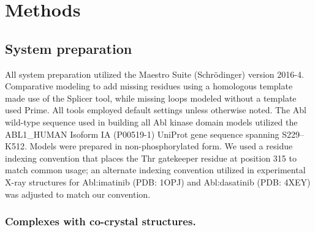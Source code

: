 \documentclass[phd,tocprelim]{cornell}
\begin{document}
\section{Methods}
\label{sec:methods}

\subsection{System preparation}
All system preparation utilized the Maestro Suite (Schr\"{o}dinger) version 2016-4. 
Comparative modeling to add missing residues using a homologous template made use of the Splicer tool, while missing loops modeled without a template used Prime. 
All tools employed default settings unless otherwise noted.
The Abl wild-type sequence used in building all Abl kinase domain models utilized the ABL1\_HUMAN Isoform IA (P00519-1) UniProt gene sequence spanning S229--K512.
Models were prepared in non-phosphorylated form.
We used a residue indexing convention that places the Thr gatekeeper residue at position 315 to match common usage; an alternate indexing convention utilized in experimental X-ray structures for Abl:imatinib (PDB: 1OPJ) \citep{Nagar:Cell:2003} and Abl:dasatinib (PDB: 4XEY) \citep{Lorenz:Biochem.J.:2015} was adjusted to match our convention. 

\subsubsection{Complexes with co-crystal structures.}
\end{document}

